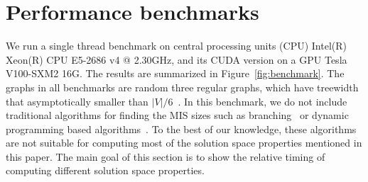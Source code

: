 \documentclass[onefignum, onetabnum]{siamart190516}
\newcommand{\<}{\langle}
\renewcommand{\>}{\rangle}
\begin{document}
\section{Performance benchmarks}\label{sec:benchmark}
We run a single thread benchmark on central processing units (CPU) Intel(R) Xeon(R) CPU E5-2686 v4 @ 2.30GHz, and its CUDA version on a GPU Tesla V100-SXM2 16G.
The results are summarized in Figure~\ref{fig:benchmark}.
The graphs in all benchmarks are random three regular graphs, which have treewidth that asymptotically smaller than $|V|/6$~\cite{Fomin2006}.
In this benchmark, we do not include traditional algorithms for finding the MIS sizes such as branching~\cite{Tarjan1977, Robson1986} or dynamic programming based algorithms~\cite{Courcelle1990, Fomin2013}.
To the best of our knowledge, these algorithms are not suitable for computing most of the solution space properties mentioned in this paper.
The main goal of this section is to show the relative timing of computing different solution space properties.
\end{document}
